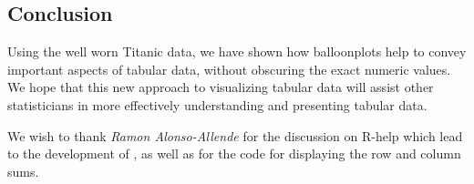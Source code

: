 \documentclass[a4paper]{report}
\begin{document}
\begin{article}
\section*{Conclusion}

Using the well worn Titanic data, we have shown how balloonplots
help to convey important aspects of tabular data, without obscuring
the exact numeric values. We hope that this new approach to
visualizing tabular data will assist other statisticians in more
effectively understanding and presenting tabular data.

We wish to thank \emph{Ramon Alonso-Allende}
 for the discussion on R-help which lead
to the development of , as well as for the code for
displaying the row and column sums.

\address{Gregory R. Warnes, Pfizer Inc., USA\\
\\
       Nitin Jain, The Cambridge Group, LTD., USA\\
}

\end{article}
\end{document}

